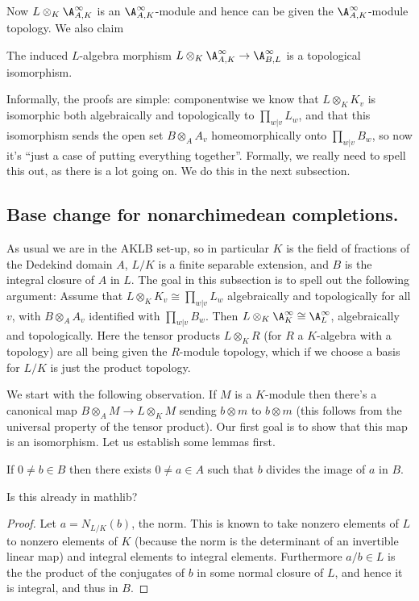 Now $L\otimes_K\A_{A,K}^\infty$ is an $\A_{A,K}^\infty$-module and hence can be given
the $\A_{A,K}^\infty$-module topology. We also claim

\begin{theorem}
  \label{IsDedekindDomain.FiniteAdeleRing.baseChangeContinuousAlgEquiv}
  \leanok
The induced $L$-algebra morphism
  $L\otimes_K\A_{A,K}^\infty\to\A_{B,L}^\infty$ is a topological isomorphism.
\end{theorem}

Informally, the proofs are simple: componentwise we know
that $L\otimes_KK_v$ is isomorphic both algebraically and
topologically to $\prod_{w|v}L_w$, and that this isomorphism
sends the open set $B\otimes_AA_v$ homeomorphically onto
$\prod_{w|v}B_w$, so now it's ``just a case of putting everything
together''. Formally, we really need to spell this out, as there is a lot
going on. We do this in the
next subsection.

\subsection{Base change for nonarchimedean completions.}

As usual we are in the AKLB set-up, so in particular $K$ is the field
of fractions of the Dedekind domain $A$, $L/K$ is a finite
separable extension, and $B$ is the integral closure of $A$
in $L$. The goal in this subsection is to spell out the following argument: Assume that
$L\otimes_KK_v\cong\prod_{w|v}L_w$
algebraically and topologically for all $v$, with $B\otimes_AA_v$ identified with $\prod_{w|v}B_w$.
Then $L\otimes_K\A_K^\infty\cong\A_L^\infty$, algebraically and topologically. Here
the tensor products $L\otimes_K R$ (for $R$ a $K$-algebra with a topology) are all being
given the $R$-module topology, which if we choose a basis for $L/K$ is just the product
topology.

We start with the following observation. If $M$ is a $K$-module then there's a canonical
map $B\otimes_AM\to L\otimes_KM$ sending $b\otimes m$ to $b\otimes m$ (this follows from the
universal property of the tensor product). Our first goal
is to show that this map is an isomorphism. Let us establish some lemmas first.

\begin{lemma}
  \label{IsDedekindDomain.dvd_norm}
  If $0\not=b\in B$ then there exists $0\not=a\in A$ such that $b$ divides
  the image of $a$ in $B$.
\end{lemma}
\begin{remark} Is this already in mathlib?
\end{remark}
\begin{proof} Let $a=N_{L/K}(b)$, the norm. This is known to take nonzero elements of $L$
to nonzero elements of $K$ (because the norm is the determinant of an invertible linear map)
and integral elements to integral elements. Furthermore $a/b\in L$ is the the product of the
conjugates of $b$ in some normal closure of $L$, and hence it is integral, and thus in $B$.
\end{proof}

